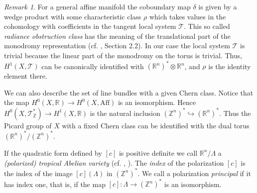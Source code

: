 \documentclass[12pt]{amsart}
\theoremstyle{plain}
\theoremstyle{definition}
\theoremstyle{remark}
\newtheorem*{remark}{Remark}
\newcommand{\Z}{\mathbb Z}    %
\newcommand{\R}{\mathbb R}    %
\newcommand{\Aff}{\operatorname{Af{}f}}
\newcommand{\<}{\langle}   %
\renewcommand{\>}{\rangle} %
\begin{document}
\begin{remark} For a general affine manifold the coboundary map $\delta$ is
given by a wedge product with some characteristic class $\rho$ which takes
values in the cohomology with coefficients in the tangent local system $\mathcal T$.
This  so called {\em radiance obstruction class} has the meaning of the
translational part of the monodromy representation (cf. \cite{KS04}, Section
2.2). In our case the local system $\mathcal T$ is trivial because the linear part of
the monodromy on the torus is trivial. Thus, $H^1(X,\mathcal T)$ can be canonically
identified with $(\R^n)^*\otimes \R^n$, and $\rho$ is the identity element
there.
\end{remark}

We can also describe the set of line bundles with a given Chern class. Notice
that the map $H^0(X,\R)\rightarrow H^0(X,\Aff)$ is an isomorphism. Hence
$H^0(X,{\mathcal T}^*_\Z)\rightarrow H^1(X,\R)$ is the natural inclusion
$(\Z^n)^*\hookrightarrow (\R^n)^*$. Thus the Picard group of $X$ with a fixed
Chern class can be identified with the dual torus $(\R^n)^*/(\Z^n)^*$.

If the quadratic form defined by $[c]$ is positive definite we call
$\R^n/\Lambda$ a {\em (polarized) tropical Abelian variety}
(cf. \cite{Alexeev-Nakamura}, \cite{Alexeev}). The {\em index} of
the polarization $[c]$ is the index of the image $[c](\Lambda)$ in $(\Z^n)^*$.
We call a polarization {\em principal} if it has index one, that is, if the map
$[c]:\Lambda\to(\Z^n)^*$ is an isomorphism.
\end{document}
